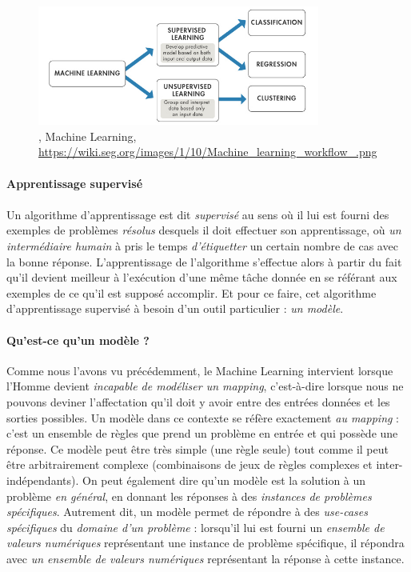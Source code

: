 \begin{figure}[h]
    \centering
    \includegraphics[width=350px]{chapters/03/images/machine-learning.png}
    \caption{\label{machine learning}, Machine Learning, \url{https://wiki.seg.org/images/1/10/Machine_learning_workflow_.png}}
\end{figure}

\paragraph{Apprentissage supervisé}

\paragraph{} Un algorithme d'apprentissage est dit \emph{supervisé} au sens où il lui est fourni des exemples de problèmes \emph{résolus} desquels
il doit effectuer son apprentissage, où \emph{un intermédiaire humain} à pris le temps \emph{d'étiquetter} un certain nombre de cas avec la bonne réponse.
L'apprentissage de l'algorithme s'effectue alors à partir du fait qu'il devient meilleur à l'exécution d'une même tâche donnée en se référant aux exemples
de ce qu'il est supposé accomplir. Et pour ce faire, cet algorithme d'apprentissage supervisé à besoin d'un outil particulier : \emph{un modèle}.

\paragraph{Qu'est-ce qu'un modèle ?} Comme nous l'avons vu précédemment, le Machine Learning intervient lorsque l'Homme devient \emph{incapable de modéliser un mapping},
c'est-à-dire lorsque nous ne pouvons deviner l'affectation qu'il doit y avoir entre des entrées données et les sorties possibles. Un modèle dans ce contexte se réfère 
exactement \emph{au mapping} : c'est un ensemble de règles que prend un problème en entrée et qui possède une réponse. Ce modèle peut être très simple (une règle seule)
tout comme il peut être arbitrairement complexe (combinaisons de jeux de règles complexes et inter-indépendants). On peut également dire qu'un modèle est la solution à un problème
\emph{en général}, en donnant les réponses à des \emph{instances de problèmes spécifiques}. Autrement dit, un modèle permet de répondre à des \emph{use-cases spécifiques} du
\emph{domaine d'un problème} \cite{MachineLearning3} : lorsqu'il lui est fourni un \emph{ensemble de valeurs numériques} représentant une instance de problème spécifique, il répondra
avec \emph{un ensemble de valeurs numériques} représentant la réponse à cette instance.

